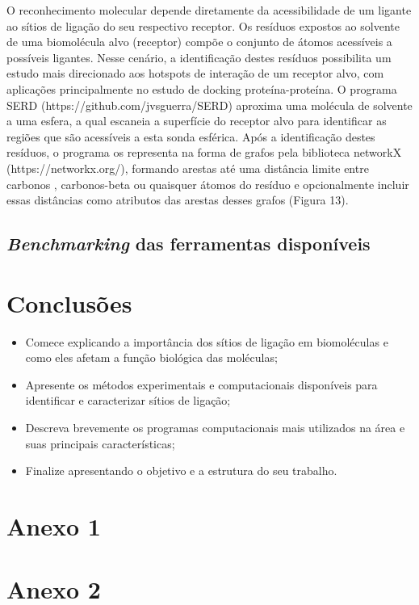 \documentclass[Portugues]{phdquali}
\begin{document}
O reconhecimento molecular depende diretamente da acessibilidade de um ligante ao sítios de ligação do seu respectivo receptor. Os resíduos expostos ao solvente de uma biomolécula alvo (receptor) compõe o conjunto de átomos acessíveis a possíveis ligantes. Nesse cenário, a identificação destes resíduos possibilita um estudo mais direcionado aos hotspots de interação de um receptor alvo, com aplicações principalmente no estudo de docking proteína-proteína. O programa SERD (https://github.com/jvsguerra/SERD) aproxima uma molécula de solvente a uma esfera, a qual escaneia a superfície do receptor alvo para identificar as regiões que são acessíveis a esta sonda esférica. Após a identificação destes resíduos, o programa os representa na forma de grafos pela biblioteca networkX (https://networkx.org/), formando arestas até uma distância limite entre carbonos \textalpha, carbonos-beta ou quaisquer átomos do resíduo e opcionalmente incluir essas distâncias como atributos das arestas desses grafos (Figura 13). 

\section{\textit{Benchmarking} das ferramentas disponíveis}


\chapter{Conclusões}

\begin{itemize}
  \item Comece explicando a importância dos sítios de ligação em biomoléculas e como eles afetam a função biológica das moléculas;
  \item Apresente os métodos experimentais e computacionais disponíveis para identificar e caracterizar sítios de ligação;
  \item Descreva brevemente os programas computacionais mais utilizados na área e suas principais características;
  \item Finalize apresentando o objetivo e a estrutura do seu trabalho.
 \end{itemize}





\appendix
\chapter{Anexo 1}
\chapter{Anexo 2}
\end{document}
